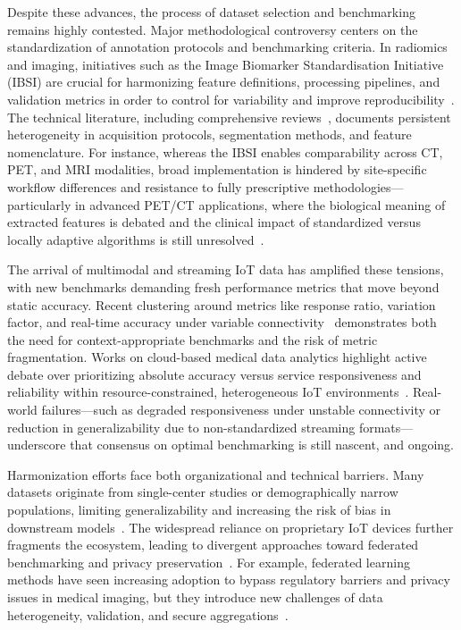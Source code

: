 \documentclass[sigconf]{acmart}
\begin{document}
Despite these advances, the process of dataset selection and benchmarking remains highly contested. Major methodological controversy centers on the standardization of annotation protocols and benchmarking criteria. In radiomics and imaging, initiatives such as the Image Biomarker Standardisation Initiative (IBSI) are crucial for harmonizing feature definitions, processing pipelines, and validation metrics in order to control for variability and improve reproducibility~\cite{ref44}. The technical literature, including comprehensive reviews~\cite{ref45,ref46}, documents persistent heterogeneity in acquisition protocols, segmentation methods, and feature nomenclature. For instance, whereas the IBSI enables comparability across CT, PET, and MRI modalities, broad implementation is hindered by site-specific workflow differences and resistance to fully prescriptive methodologies—particularly in advanced PET/CT applications, where the biological meaning of extracted features is debated and the clinical impact of standardized versus locally adaptive algorithms is still unresolved~\cite{ref45}.

The arrival of multimodal and streaming IoT data has amplified these tensions, with new benchmarks demanding fresh performance metrics that move beyond static accuracy. Recent clustering around metrics like response ratio, variation factor, and real-time accuracy under variable connectivity~\cite{ref106} demonstrates both the need for context-appropriate benchmarks and the risk of metric fragmentation. Works on cloud-based medical data analytics highlight active debate over prioritizing absolute accuracy versus service responsiveness and reliability within resource-constrained, heterogeneous IoT environments~\cite{ref106,ref90}. Real-world failures—such as degraded responsiveness under unstable connectivity or reduction in generalizability due to non-standardized streaming formats—underscore that consensus on optimal benchmarking is still nascent, and ongoing.

Harmonization efforts face both organizational and technical barriers. Many datasets originate from single-center studies or demographically narrow populations, limiting generalizability and increasing the risk of bias in downstream models~\cite{ref43,ref75,ref106}. The widespread reliance on proprietary IoT devices further fragments the ecosystem, leading to divergent approaches toward federated benchmarking and privacy preservation~\cite{ref51,ref84,ref106}. For example, federated learning methods have seen increasing adoption to bypass regulatory barriers and privacy issues in medical imaging, but they introduce new challenges of data heterogeneity, validation, and secure aggregations~\cite{ref51}.
\end{document}
